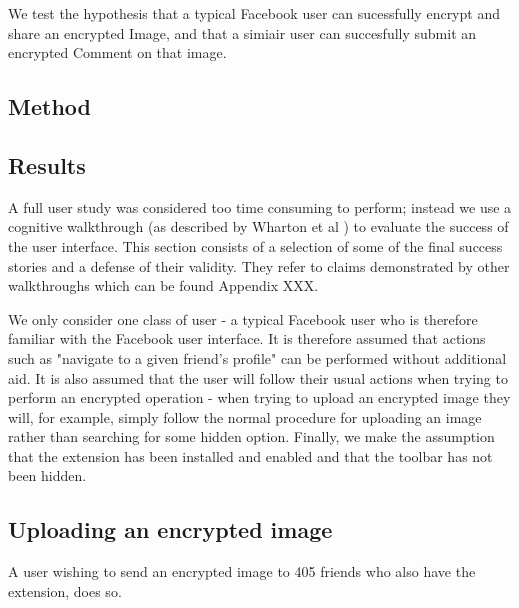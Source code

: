 We test the hypothesis that a typical Facebook user can sucessfully encrypt and share an encrypted Image, and that a simiair user can succesfully submit an encrypted Comment on that image.


\subsection{Method}


\subsection{Results}

A full user study was considered too time consuming to perform; instead we use a cognitive walkthrough (as described by Wharton et al \cite{cogwalk}) to evaluate the success of the user interface. This section consists of a selection of some of the final success stories and a defense of their validity. They refer to claims demonstrated by other walkthroughs which can be found Appendix XXX.

We only consider one class of user - a typical Facebook user who is therefore familiar with the Facebook user interface. It is therefore assumed that actions such as "navigate to a given friend's profile" can be performed without additional aid. It is also assumed that the user will follow their usual actions when trying to perform an encrypted operation - when trying to upload an encrypted image they will, for example, simply follow the normal procedure for uploading an image rather than searching for some hidden option. Finally, we make the assumption that the extension has been installed and enabled and that the toolbar has not been hidden.


\subsection{Uploading an encrypted image}
A user wishing to send an encrypted image to 405 friends who also have the extension, does so.


